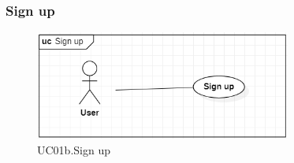\documentclass[../thesis.tex]{subfiles}
\begin{document}
\subsubsection{Sign up}
\begin{figure}[H]
    \centering
    \includegraphics[width=0.75\textwidth]{images/UCD_Signup.png}
    \caption{UC01b.Sign up}
    \label{fig:UCD-sign-up}
\end{figure}
\end{document}
